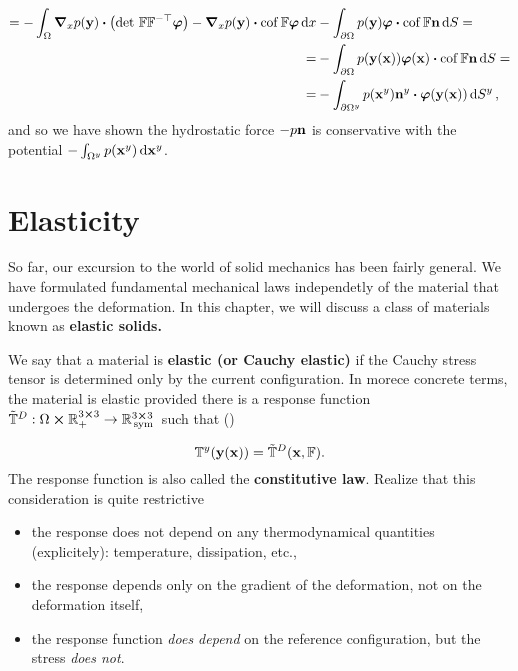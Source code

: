 \documentclass[11pt]{scrartcl} %
\begin{document}
\begin{example}
\begin{align*}
		= - \int_{\Omega}\grad_x p\qty(\vb{y}) \vdot \qty(\detf \transposei{\fgrad} \vb*{\varphi}) - \grad_x p\qty(\vb{y}) \vdot \cof \fgrad \vb*{\varphi}\dd{x} &- \int_{\partial \Omega}p\qty(\vb{y})\vb*{\varphi} \vdot \cof \fgrad \vb{n}\dd{S} = \\
		=&- \int_{\partial \Omega}p\qty(\vb{y}\qty(\vb{x})) \vb*{\varphi}\qty(\vb{x}) \vdot \cof \fgrad \vb{n}\dd{S} = \\
		=&-\int_{\partial \Omega^{y}} p\qty(\vb{x}^{y})\vb{n}^{y} \vdot\vb*{\varphi}\qty(\vb{y}\qty(\vb{x})) \dd{S^{y}},
	\end{align*}
	and so we have shown the hydrostatic force $-p\vb{n}$ is conservative with the potential $-\int_{\Omega^{y}}p\qty(\vb{x}^{y})\dd{\vb{x}^{y}}$.
    \end{example}
    
\section{Elasticity}
\label{sec:elasticity}
So far, our excursion to the world of solid mechanics has been fairly general. We have formulated fundamental mechanical laws independetly of the material that undergoes the deformation. In this chapter, we will discuss a class of materials known as \textbf{elastic solids.}

\begin{definition}[Elasticity]
	We say that a material is \textbf{elastic (or Cauchy elastic)} if the Cauchy stress tensor is determined only by the current configuration. In morece concrete terms, the material is elastic provided there is a response function $\tilde{\mathbb{T}}^D:\Omega \cross {\mathbb R}^{3 \cross 3}_+ \to {\mathbb R}^{3 \cross 3}_{\, \text{sym} \,}$ such that (\cite{kruzikElasticMaterials2019})

\[
	\mathbb{T}^y\qty(\vb{y}(\vb{x}))= \tilde{\mathbb{T}}^D\qty(\vb{x},\mathbb{F}).
\]
The response function is also called the \textbf{constitutive law}. Realize that this consideration is quite restrictive 

\begin{itemize}
	\item the response does not depend on any thermodynamical quantities (explicitely): temperature, dissipation, etc.,
	\item the response depends only on the gradient of the deformation, not on the deformation itself,
	\item the response function \textit{does depend} on the reference configuration, but the stress \textit{does not}.
\end{itemize}
\end{definition}
\end{document}
